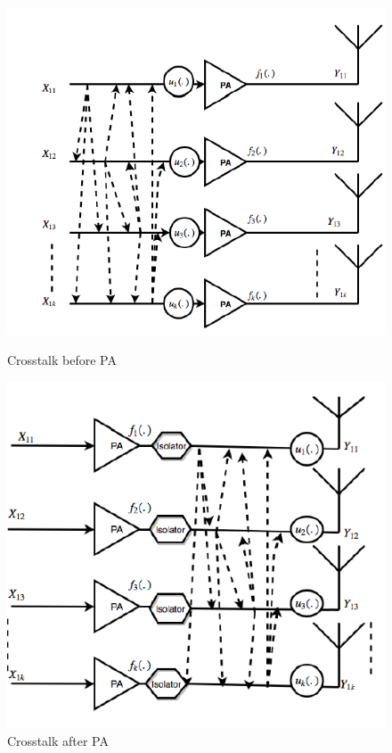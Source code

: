 \begin{figure}[H]
  \centering
  \begin{minipage}[b]{0.5\textwidth}
	\includegraphics[scale = 0.5]{figures/ch1/crosstalk_before}
	\caption{Crosstalk before PA \citep{islam2017}}	
    \label{fig:cross_bf}
  \end{minipage}
  \hfill
  \begin{minipage}[b]{0.4\textwidth}
	\includegraphics[scale = 0.5]{figures/ch1/crosstalk_after}
	\caption{Crosstalk after PA \citep{islam2017}}
    \label{fig:cross_af}
  \end{minipage}
\end{figure}

